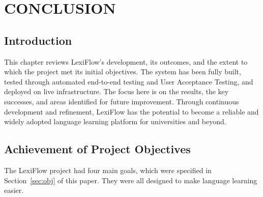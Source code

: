 \documentclass[oneside]{utmthesis}
\begin{document}
\chapter{CONCLUSION}
\section{Introduction}
This chapter reviews LexiFlow's development, its outcomes, and the extent to which the project met its initial objectives. The system has been fully built, tested through automated end-to-end testing and User Acceptance Testing, and deployed on live infrastructure. The focus here is on the results, the key successes, and areas identified for future improvement. Through continuous development and refinement, LexiFlow has the potential to become a reliable and widely adopted language learning platform for universities and beyond.

\section{Achievement of Project Objectives}The LexiFlow project had four main goals, which were specified in Section~\ref{sec:obj} of this paper.  They were all designed to make language learning easier.
\end{document}
